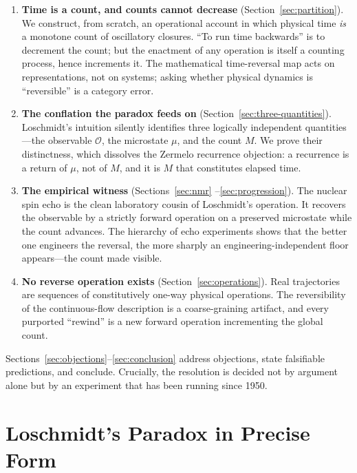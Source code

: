 \documentclass[11pt,a4paper]{article}
\theoremstyle{thmstyle}
\theoremstyle{definition}
\theoremstyle{remark}
\newcommand{\Count}{M}
\newcommand{\Obs}{\mathcal{O}}
\newcommand{\Mic}{\mu}
\begin{document}
\begin{enumerate}[leftmargin=1.5em,itemsep=0.25em]
\item \textbf{Time is a count, and counts cannot decrease}
(Section~\ref{sec:partition}). We construct, from scratch, an
operational account in which physical time \emph{is} a monotone count of
oscillatory closures. ``To run time backwards'' is to decrement the
count; but the enactment of any operation is itself a counting process,
hence increments it. The mathematical time-reversal map acts on
representations, not on systems; asking whether physical dynamics is
``reversible'' is a category error.

\item \textbf{The conflation the paradox feeds on}
(Section~\ref{sec:three-quantities}). Loschmidt's intuition silently
identifies three logically independent quantities---the observable
$\Obs$, the microstate $\Mic$, and the count $\Count$. We prove their
distinctness, which dissolves the Zermelo recurrence objection: a
recurrence is a return of $\Mic$, not of $\Count$, and it is $\Count$
that constitutes elapsed time.

\item \textbf{The empirical witness} (Sections~\ref{sec:nmr}%
--\ref{sec:progression}). The nuclear spin echo is the clean laboratory
cousin of Loschmidt's operation. It recovers the observable by a
strictly forward operation on a preserved microstate while the count
advances. The hierarchy of echo experiments shows that the better one
engineers the reversal, the more sharply an engineering-independent
floor appears---the count made visible.

\item \textbf{No reverse operation exists} (Section~\ref{sec:operations}).
Real trajectories are sequences of constitutively one-way physical
operations. The reversibility of the continuous-flow description is a
coarse-graining artifact, and every purported ``rewind'' is a new
forward operation incrementing the global count.
\end{enumerate}

Sections~\ref{sec:objections}--\ref{sec:conclusion} address objections,
state falsifiable predictions, and conclude. Crucially, the resolution
is decided not by argument alone but by an experiment that has been
running since 1950.

\section{Loschmidt's Paradox in Precise Form}
\label{sec:precise}
\end{document}
